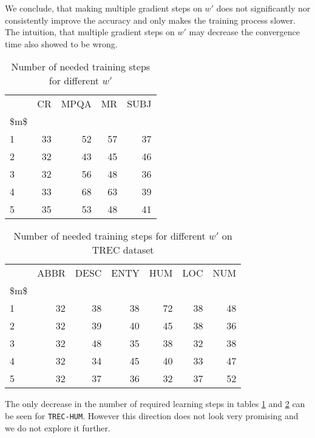     

    We conclude, that making multiple gradient steps on $w'$ does not significantly nor consistently improve the accuracy and only makes the training process slower.
    The intuition, that multiple gradient steps on $w'$ may decrease the convergence time also showed to be wrong.


\begin{table}[H]
\begin{center}

\begin{tabular}{lrrrr}
\toprule
{} & CR & MPQA & MR & SUBJ \\
\$m\$ &      &       &      &       \\
\midrule
1  &     33 &      52 &     57 &      37 \\
2  &     32 &      43 &     45 &      46 \\
3  &     32 &      56 &     48 &      36 \\
4  &     33 &      68 &     63 &      39 \\
5  &     35 &      53 &     48 &      41 \\
\bottomrule
\end{tabular}

\caption[Number of needed training steps for different $w'$]{Number of needed training steps for different $w'$}
\label{tab:multyw:steps}
\end{center}
\end{table}


\begin{table}[H]
\begin{center}

\begin{tabular}{lrrrrrr}
\toprule
{} & ABBR & DESC & ENTY & HUM & LOC & NUM \\
\$m\$ &          &          &          &         &         &         \\
\midrule
1  &        32 &        38 &        38 &        72 &        38 &        48 \\
2  &        32 &        39 &        40 &        45 &        38 &        36 \\
3  &        32 &        48 &        35 &        38 &        32 &        38 \\
4  &        32 &        34 &        45 &        40 &        33 &        47 \\
5  &        32 &        37 &        36 &        32 &        37 &        52 \\
\bottomrule
\end{tabular}

\caption[Number of needed training steps for different $w'$ on TREC dataset]{Number of needed training steps for different $w'$ on TREC dataset}
\label{tab:multyw:steps:trec}
\end{center}
\end{table}

    The only decrease in the number of required learning steps in tables \ref{tab:multyw:steps} and \ref{tab:multyw:steps:trec} can be seen for \texttt{TREC-HUM}.
    However this direction does not look very promising and we do not explore it further.
    